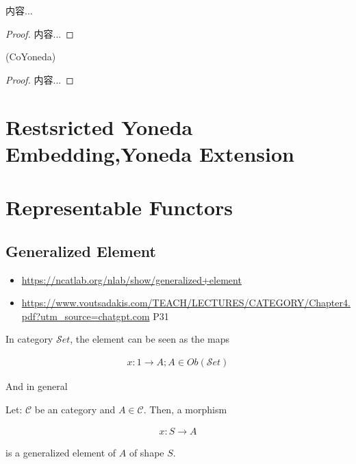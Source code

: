 \documentclass[Total.tex]{subfiles}
\begin{document}
			\begin{corollary}
				内容...
			\end{corollary}
			\begin{proof}
				内容...
			\end{proof}
			
			\begin{corollary}
				(CoYoneda)
			\end{corollary}
			\begin{proof}
				内容...
			\end{proof}
		
		\section{Restsricted Yoneda Embedding,Yoneda Extension}
		\section{Representable Functors}
		
		\subsection{Generalized Element}
		
		\begin{itemize}
			\item 	\url{https://ncatlab.org/nlab/show/generalized+element}
			
			\item \url{https://www.voutsadakis.com/TEACH/LECTURES/CATEGORY/Chapter4.pdf?utm_source=chatgpt.com} P31
		\end{itemize}
		
		In category ${\mathcal Set}$, the element can be seen as the maps
		
		\begin{gather*}
			x:1\rightarrow A;A\in Ob({\mathcal Set})
		\end{gather*}
		
		And in general
		
		\begin{Def}
			\label{Category-Theory-Generalized-Element}Let: $\mathcal{C}$ be an category and $A\in \mathcal{C}$. Then, a morphism
			
			\begin{gather*}
				x:S\rightarrow A
			\end{gather*}
			
			is a generalized element of $A$ of shape $S$.
		\end{Def}
		
\end{document}
